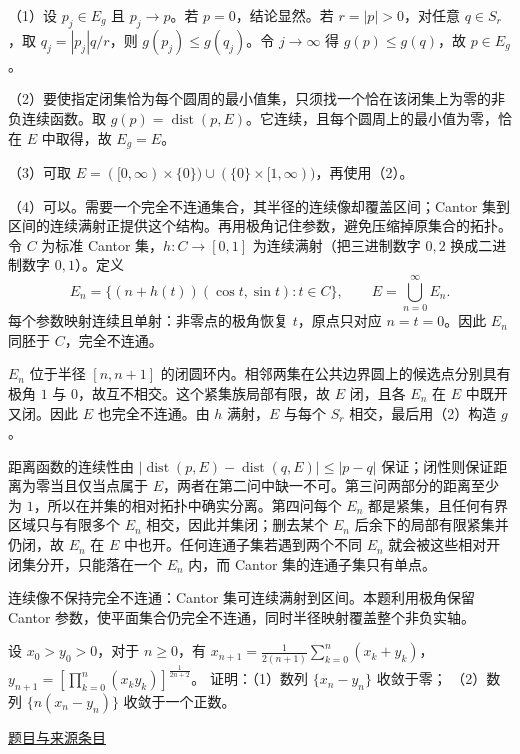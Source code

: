 \documentclass[12pt,fontset=fandol]{ctexart}
\begin{document}
\begin{solve}\label{ans:fin16-high:8}

（1）设 $p_j\in E_g$ 且 $p_j\to p$。若 $p=0$，结论显然。若 $r=|p|>0$，对任意 $q\in S_r$，取 $q_j=|p_j|q/r$，则 $g(p_j)\le g(q_j)$。令 $j\to\infty$ 得 $g(p)\le g(q)$，故 $p\in E_g$。

（2）要使指定闭集恰为每个圆周的最小值集，只须找一个恰在该闭集上为零的非负连续函数。取 $g(p)=\operatorname{dist}(p,E)$。它连续，且每个圆周上的最小值为零，恰在 $E$ 中取得，故 $E_g=E$。

（3）可取 $E=([0,\infty)\times\{0\})\cup(\{0\}\times[1,\infty))$，再使用（2）。

（4）可以。需要一个完全不连通集合，其半径的连续像却覆盖区间；Cantor 集到区间的连续满射正提供这个结构。再用极角记住参数，避免压缩掉原集合的拓扑。令 $C$ 为标准 Cantor 集，$h:C\to[0,1]$ 为连续满射（把三进制数字 $0,2$ 换成二进制数字 $0,1$）。定义
\[
E_n=\{(n+h(t))(\cos t,\sin t):t\in C\},\qquad E=\bigcup_{n=0}^\infty E_n.
\]
每个参数映射连续且单射：非零点的极角恢复 $t$，原点只对应 $n=t=0$。因此 $E_n$ 同胚于 $C$，完全不连通。

$E_n$ 位于半径 $[n,n+1]$ 的闭圆环内。相邻两集在公共边界圆上的候选点分别具有极角 $1$ 与 $0$，故互不相交。这个紧集族局部有限，故 $E$ 闭，且各 $E_n$ 在 $E$ 中既开又闭。因此 $E$ 也完全不连通。由 $h$ 满射，$E$ 与每个 $S_r$ 相交，最后用（2）构造 $g$。

距离函数的连续性由 $|\operatorname{dist}(p,E)-\operatorname{dist}(q,E)|\le|p-q|$ 保证；闭性则保证距离为零当且仅当点属于 $E$，两者在第二问中缺一不可。第三问两部分的距离至少为 $1$，所以在并集的相对拓扑中确实分离。第四问每个 $E_n$ 都是紧集，且任何有界区域只与有限多个 $E_n$ 相交，因此并集闭；删去某个 $E_n$ 后余下的局部有限紧集并仍闭，故 $E_n$ 在 $E$ 中也开。任何连通子集若遇到两个不同 $E_n$ 就会被这些相对开闭集分开，只能落在一个 $E_n$ 内，而 Cantor 集的连通子集只有单点。

\end{solve}

\begin{remark}[方法与条件]连续像不保持完全不连通：Cantor 集可连续满射到区间。本题利用极角保留 Cantor 参数，使平面集合仍完全不连通，同时半径映射覆盖整个非负实轴。\end{remark}

\begin{example}\label{ex:fin16-low:9}\label{pr:fin16-low:9}

设 $x_0 > y_0 > 0$，对于 $n \geq 0$，有
$x_{n+1} = \frac{1}{2(n+1)} \sum_{k=0}^{n} (x_k + y_k)$，$y_{n+1} = \left[ \prod_{k=0}^{n} (x_k y_k) \right]^{\frac{1}{2n+2}}$。
证明：（1）数列 $\{x_n - y_n\}$ 收敛于零；
（2）数列 $\{n(x_n - y_n)\}$ 收敛于一个正数。

\par\href{https://github.com/lzxcr/cmc-mathematics/blob/64916fa1fdbc3e444a652eca204d5669058ee321/src/problems/finals/16/10.md}{题目与来源条目}

\end{example}
\end{document}
